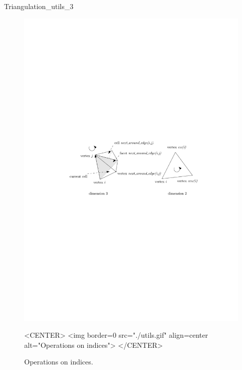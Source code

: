 \begin{ccRefClass}{Triangulation_utils_3}
\begin{figure}[htbp]
\begin{ccTexOnly}
\begin{center} 
\includegraphics{TriangulationDS_3_ref/utils} 
\end{center}
\end{ccTexOnly}
\caption{Operations on indices.
\label{Triangulation3-fig-utils}}
\begin{ccHtmlOnly}
<CENTER>
<img border=0 src="./utils.gif" align=center alt="Operations on indices">
</CENTER>
\end{ccHtmlOnly}
\end{figure} 

\end{ccRefClass}
